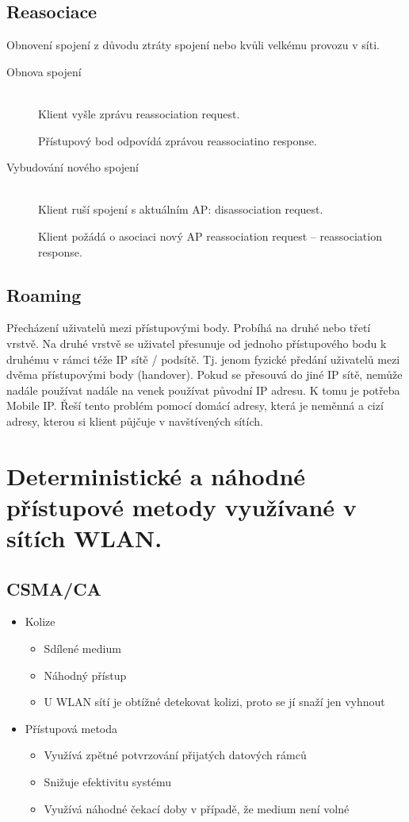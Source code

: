 \subsection{Reasociace}
Obnovení spojení z důvodu ztráty spojení nebo kvůli velkému provozu v síti.
\begin{description}
    \item [Obnova spojení] \hfill \\
    Klient vyšle zprávu reassociation request. \par
    Přístupový bod odpovídá zprávou reassociatino response. \par
    \item[Vybudování nového spojení] \hfill \\
    Klient ruší spojení s aktuálním AP: disassociation request. \par
    Klient požádá o asociaci nový AP reassociation request -- reassociation response. \par
\end{description}
\subsection{Roaming}
Přecházení uživatelů mezi přístupovými body. Probíhá na druhé nebo třetí vrstvě. Na druhé vrstvě se uživatel přesunuje od jednoho přístupového bodu k druhému v rámci téže IP sítě / podsítě. Tj. jenom fyzické předání uživatelů mezi dvěma přístupovými body (handover). Pokud se přesouvá do jiné IP sítě, nemůže nadále používat nadále na venek používat původní IP adresu. K tomu je potřeba Mobile IP. Řeší tento problém pomocí domácí adresy, která je neměnná a cizí adresy, kterou si klient půjčuje v navštívených sítích.




\newpage
\section{Deterministické a náhodné přístupové metody využívané v sítích WLAN.}
\subsection{CSMA/CA}
\begin{itemize}
\item Kolize
\begin{itemize}
    \item Sdílené medium 
    \item Náhodný přístup
    \item U WLAN sítí je obtížné detekovat kolizi, proto se jí snaží jen vyhnout
\end{itemize}

  
\item Přístupová metoda 
\begin{itemize}
    \item Využívá zpětné potvrzování přijatých datových rámců 
    \item Snižuje efektivitu systému 
    \item Využívá náhodné čekací doby v případě, že medium není volné
\end{itemize}
\end{itemize}




